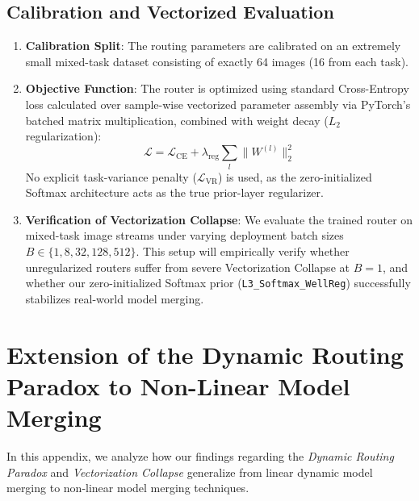 \documentclass{article}
\theoremstyle{plain}
\theoremstyle{definition}
\theoremstyle{remark}
\begin{document}
\subsection{Calibration and Vectorized Evaluation}
\begin{enumerate}
    \item \textbf{Calibration Split}: The routing parameters are calibrated on an extremely small mixed-task dataset consisting of exactly 64 images (16 from each task).
    \item \textbf{Objective Function}: The router is optimized using standard Cross-Entropy loss calculated over sample-wise vectorized parameter assembly via PyTorch's batched matrix multiplication, combined with weight decay ($L_2$ regularization):
    \begin{equation}
        \mathcal{L} = \mathcal{L}_{\text{CE}} + \lambda_{\text{reg}} \sum_l \|W^{(l)}\|_2^2
    \end{equation}
    No explicit task-variance penalty ($\mathcal{L}_{\text{VR}}$) is used, as the zero-initialized Softmax architecture acts as the true prior-layer regularizer.
    \item \textbf{Verification of Vectorization Collapse}: We evaluate the trained router on mixed-task image streams under varying deployment batch sizes $B \in \{1, 8, 32, 128, 512\}$. This setup will empirically verify whether unregularized routers suffer from severe Vectorization Collapse at $B=1$, and whether our zero-initialized Softmax prior (\texttt{L3\_Softmax\_WellReg}) successfully stabilizes real-world model merging.
\end{enumerate}

\section{Extension of the Dynamic Routing Paradox to Non-Linear Model Merging}
\label{app:nonlinear}
In this appendix, we analyze how our findings regarding the \emph{Dynamic Routing Paradox} and \emph{Vectorization Collapse} generalize from linear dynamic model merging to non-linear model merging techniques.
\end{document}

